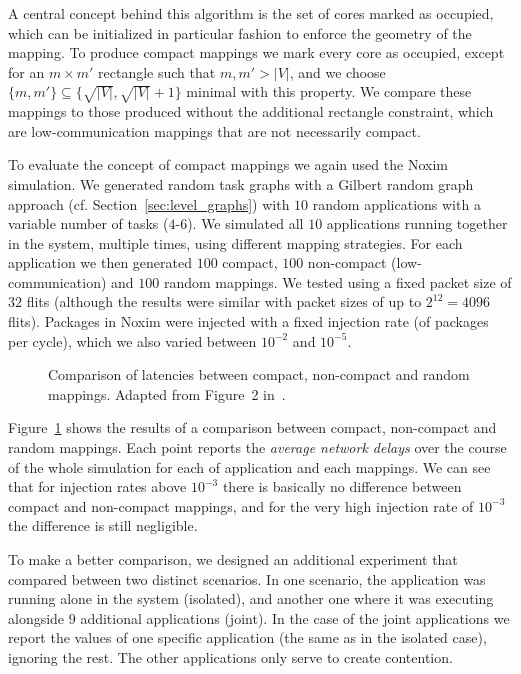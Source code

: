 A central concept behind this algorithm is the set of cores marked as occupied, which can be initialized in particular fashion to enforce the geometry of the mapping.
To produce compact mappings we mark every core as occupied, except for an $m \times m'$ rectangle such that $m,m' > |V|$, and we choose $\{m,m'\} \subseteq \{ \sqrt{|V|}, \sqrt{|V|}+1\}$ minimal with this property.
We compare these mappings to those produced without the additional rectangle constraint, which are low-communication mappings that are not necessarily compact.

To evaluate the concept of compact mappings we again used the Noxim simulation.
We generated random task graphs with a Gilbert random graph approach (cf. Section~\ref{sec:level_graphs}) with $10$ random applications with a variable number of tasks ($4$-$6$).
We simulated all $10$ applications running together in the system, multiple times, using different mapping strategies. 
For each application we then generated $100$ compact, $100$ non-compact (low-communication) and $100$ random mappings. 
We tested using a fixed packet size of $32$ flits (although the results were similar with packet sizes of up to $2^{12} = 4096$ flits).
Packages in Noxim were injected with a fixed injection rate (of packages per cycle), which we also varied between $10^{-2}$ and $10^{-5}$. 

\begin{figure}[h]
	\centering
	\caption{Comparison of latencies between compact, non-compact and random mappings. Adapted from Figure~2 in~\cite{goens_samos19}.}
	\label{fig:compact_latency}
\end{figure}

Figure~\ref{fig:compact_latency} shows the results of a comparison between compact, non-compact and random mappings. 
Each point reports the \emph{average network delays} over the course of the whole simulation for each of application and each mappings. 
We can see that for injection rates above $10^{-3}$ there is basically no difference between compact and non-compact mappings, and for the very high injection rate of $10^{-3}$ the difference is still negligible.

To make a better comparison, we designed an additional experiment that compared between two distinct scenarios.
In one scenario, the application was running alone in the system (isolated), and another one where it was executing alongside $9$ additional applications (joint).
In the case of the joint applications we report the values of one specific application (the same as in the isolated case), ignoring the rest.
The other applications only serve to create contention.

